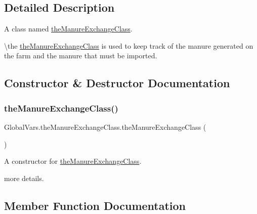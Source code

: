 \subsection{Detailed Description}
A class named \mbox{\hyperlink{class_global_vars_1_1the_manure_exchange_class}{the\+Manure\+Exchange\+Class}}. 

\textbackslash{}the \mbox{\hyperlink{class_global_vars_1_1the_manure_exchange_class}{the\+Manure\+Exchange\+Class}} is used to keep track of the manure generated on the farm and the manure that must be imported. 

\subsection{Constructor \& Destructor Documentation}
\mbox{\label{class_global_vars_1_1the_manure_exchange_class_a81c638e25498afce3347dcb34bf1744a}} 
\subsubsection{\texorpdfstring{theManureExchangeClass()}{theManureExchangeClass()}}
{\footnotesize\ttfamily Global\+Vars.\+the\+Manure\+Exchange\+Class.\+the\+Manure\+Exchange\+Class (\begin{DoxyParamCaption}{ }\end{DoxyParamCaption})\hspace{0.3cm}{\ttfamily [inline]}}



A constructor for \mbox{\hyperlink{class_global_vars_1_1the_manure_exchange_class}{the\+Manure\+Exchange\+Class}}. 

more details. 

\subsection{Member Function Documentation}
\mbox{\label{class_global_vars_1_1the_manure_exchange_class_aa73016736e7fb5158a6317c9e0e8304f}} 

